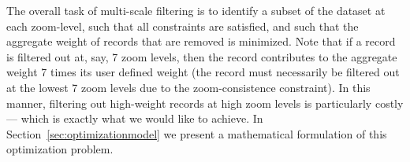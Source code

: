 The overall task of multi-scale filtering is to identify a subset of the dataset at each zoom-level, such that all constraints are satisfied, and such that the aggregate weight of records that are removed is minimized. Note that if a record is filtered out at, say, 7 zoom levels, then the record contributes to the aggregate weight 7 times its user defined weight (the record must necessarily be filtered out at the lowest 7 zoom levels due to the zoom-consistence constraint). In this manner, filtering out high-weight records at high zoom levels is particularly costly --- which is exactly what we would like to achieve. In Section~\ref{sec:optimizationmodel} we present a mathematical formulation of this optimization problem.
